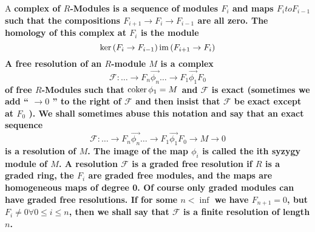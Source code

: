\documentclass{article}
\begin{document}
\begin{defn}
	A \bf{complex} of \(R\)-Modules is a sequence of modules \( F_{i} \)
	and maps \( F_{i} to F_{i-1} \) such that the compositions \( F_{i+1} \to F_{i} \to F_{i-1} \) are all zero.
	The \bf{homology} of this complex at \( F_{i} \) is the module 
	\[
		        \ker \left( F_{i} \to F_{i-1} \right)   \/ \operatorname{im} \left( F_{i+1} \to F_{i} \right)
		\]
	A \bf{free resolution} of an \( R\)-module \( M \)
	is a complex
	\[
	        \mathcal{F}: \hdots \to F_{n} \overset{\to}{\phi_{n}} 
	        \hdots \to F_{1} \overset{\to}{\phi_{1}} F_{0}
	\]
	of free \(R\)-Modules such that \( \operatorname{coker} \phi_{1} = M \) 
	and \( \mathcal{F} \)  is exact 
	(sometimes we add `` \( \to 0 \) '' to the right of \(\mathcal{F}\) 
	and then insist that \(\mathcal{F}\) be exact except at \( F_{0} \) ).
	We shall sometimes abuse this notation and say that an exact sequence
	\[
	        \mathcal{F}: \hdots \to F_{n} \overset{\to}{\phi_{n}} 
	        \hdots \to F_{1} \overset{\to}{\phi_{1}} F_{0}
	        \to M \to 0
	\]
	is a resolution of \( M \).
	The image of the map \( \phi_i \) is called the ith syzygy module of \(M \).
	A resolution \( \mathcal{F }\) is a \bf{graded free resolution } 
	if \( R \) is a graded ring, 
	the \(  F_{i}\) are graded free modules, 
	and the maps are homogeneous maps of degree 0.
	Of course only graded modules can have graded free resolutions.
	If for some \( n < \inf \) we have \( F_{n+1}=0 \),
	but \( F_{i} \neq 0 \forall 0 \le i \le n \), then we shall say that
	\( \mathcal{F}\) is a \bf{finite resolution of length} \( n\).
\end{defn}



\end{document}
